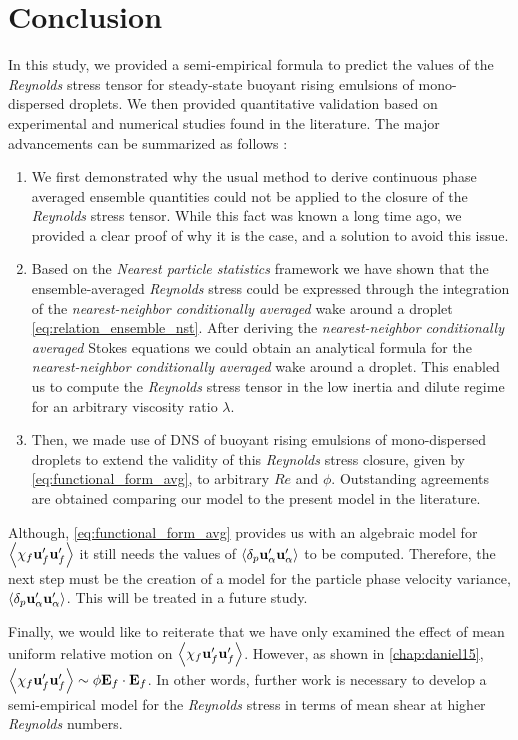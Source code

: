\section{Conclusion}

In this study, we provided a semi-empirical formula to predict the values of the \textit{Reynolds} stress tensor for steady-state buoyant rising emulsions of mono-dispersed droplets. 
We then provided quantitative validation based on experimental and numerical studies found in the literature. 
The major advancements can be summarized as follows : 
\begin{enumerate}
    \item We first demonstrated why the usual method to derive continuous phase averaged ensemble quantities could not be applied to the closure of the \textit{Reynolds} stress tensor. 
    While this fact was known a long time ago, we provided a clear proof of why it is the case, and a solution to avoid this issue. 
    \item Based on the \textit{Nearest particle statistics} framework we have shown that the ensemble-averaged \textit{Reynolds} stress could be expressed through the integration of the \textit{nearest-neighbor conditionally averaged} wake around a droplet \eqref{eq:relation_ensemble_nst}. 
    After deriving the \textit{nearest-neighbor conditionally averaged} Stokes equations we could obtain an analytical formula for the \textit{nearest-neighbor conditionally averaged} wake around a droplet.
    This enabled us to compute the \textit{Reynolds} stress tensor in the low inertia and dilute regime for an arbitrary viscosity ratio $\lambda$. 
    \item  Then, we made use of DNS of buoyant rising emulsions of mono-dispersed droplets to extend the validity of this \textit{Reynolds} stress closure, given by \ref{eq:functional_form_avg}, to arbitrary $Re$ and $\phi$. 
    Outstanding agreements are obtained comparing our model to the present model in the literature.  
\end{enumerate}
Although, \ref{eq:functional_form_avg} provides us with an algebraic model for $\left<\chi_f \textbf{u}_f'\textbf{u}_f'\right>$ it still needs the values of $\left<\delta_p \textbf{u}_\alpha' \textbf{u}_\alpha'\right>$ to be computed. 
Therefore, the next step must be the creation of a model for the particle phase velocity variance, $\left<\delta_p \textbf{u}_\alpha' \textbf{u}_\alpha'\right>$. 
This will be treated in a future study. 

Finally, we would like to reiterate that we have only examined the effect of mean uniform relative motion on $\left<\chi_f \textbf{u}_f'\textbf{u}_f'\right>$. However, as shown in \ref{chap:daniel15}, $\left<\chi_f \textbf{u}_f'\textbf{u}_f'\right> \sim \phi \textbf{E}_f \cdot \textbf{E}_f$.
In other words, further work is necessary to develop a semi-empirical model for the \textit{Reynolds} stress in terms of mean shear at higher \textit{Reynolds} numbers.

